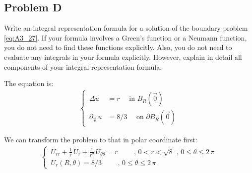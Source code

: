 \documentclass[../main.tex]{subfiles}
\begin{document}
\subsection{Problem D}

Write an integral representation formula for a solution of the boundary problem \ref{eq:A3_27}. If your formula involves a Green’s function or a Neumann function, you do not need to find these functions explicitly. Also, you do not need to evaluate any integrals in your formula explicitly. However, explain in detail all components of your integral representation formula.

The equation is:
\begin{align} 
    \begin{cases} \nonumber
        \, \Delta u &= r \quad \text{ in  } B_R(\vec{0}) \\
        \, \partial_{\vec{v}} \, u & = 8/3 \quad \text{ on  } \partial B_R(\vec{0})
    \end{cases}
\end{align}

We can transform the problem to that in polar coordinate first:
\begin{align}
    \begin{cases}
        \, U_{rr} + \frac{1}{r} \, U_r + \frac{1}{r^2} \, U_{\theta \theta} = r \qquad \text{ ,  } 0 < r < \sqrt{8} \text{ ,  } 0 \leqslant \theta \leqslant 2 \, \pi \\
        \, U_r(R,\theta) = 8/3 \qquad \text{ ,  } 0 \leqslant \theta \leqslant 2 \, \pi
    \end{cases}
\end{align}
\end{document}
